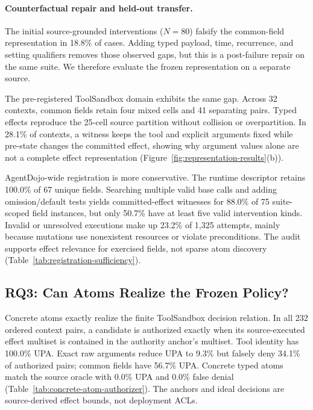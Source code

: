 \paragraph{Counterfactual repair and held-out transfer.}
The initial source-grounded interventions ($N=80$) falsify the common-field
representation in 18.8\% of cases.  Adding typed payload, time, recurrence, and
setting qualifiers removes those observed gaps, but this is a post-failure
repair on the same suite.  We therefore evaluate the frozen representation on
a separate source.

The pre-registered ToolSandbox domain exhibits the same gap.  Across 32
contexts, common fields retain four mixed
cells and 41 separating pairs.  Typed effects reproduce the 25-cell source
partition without collision or overpartition.  In 28.1\% of contexts, a
witness keeps the tool and explicit arguments fixed while pre-state changes the committed effect,
showing why argument values alone are not a complete effect representation
(Figure~\ref{fig:representation-results}(b)).



AgentDojo-wide registration is more conservative.  The runtime descriptor
retains 100.0\% of 67 unique fields.  Searching multiple
valid base calls and adding omission/default tests yields committed-effect
witnesses for 88.0\% of 75 suite-scoped field instances, but only 50.7\% have
at least five valid intervention kinds.  Invalid or unresolved executions make
up 23.2\% of 1,325 attempts, mainly because mutations use nonexistent resources
or violate preconditions.  The audit supports effect relevance for exercised
fields, not sparse atom discovery (Table~\ref{tab:registration-sufficiency}).

\subsection{RQ3: Can Atoms Realize the Frozen Policy?}



Concrete atoms exactly realize the finite ToolSandbox decision relation.  In
all 232 ordered context pairs, a candidate is authorized exactly when its
source-executed effect multiset is contained in the authority anchor's
multiset.  Tool identity has 100.0\% UPA.  Exact raw arguments reduce UPA to
9.3\% but falsely deny 34.1\% of authorized pairs; common fields have 56.7\%
UPA.  Concrete typed atoms match the source oracle with 0.0\% UPA and 0.0\%
false denial (Table~\ref{tab:concrete-atom-authorizer}).  The anchors and ideal
decisions are source-derived effect bounds, not deployment ACLs.

